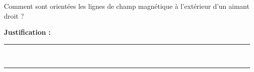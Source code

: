 Comment sont orientées les lignes de champ magnétique à l'extérieur d'un aimant droit ?

\choices

\noindent\textbf{Justification :} \hrulefill \\[2.5ex]
\rule{\linewidth}{0.4pt} \\[2.5ex]
\rule{\linewidth}{0.4pt}
\vfill
